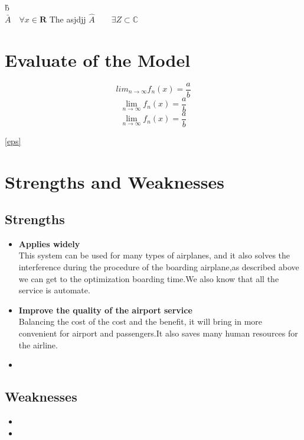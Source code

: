 \documentclass{mcmthesis}
\begin{document}
    \^{b}\\
\begin{math}
\bar{A} \quad \forall x \in \mathbf{R}
\end{math}
The asjdjj $\widehat{A}\qquad \exists Z \subset \mathbb{C}$

\section{Evaluate of the Model}
\lipsum[2]

\begin{equation}	\label{eq:eps}		%
lim_{n \to \infty} f_{n}(x) = \frac{a}{b}
\end{equation}
\[\mathop {\lim }\limits_{n \to \infty } {f_n}(x) = \frac{a}{b}\]
\begin{equation}
\mathop {\lim }\limits_{n \to \infty } {f_n}(x) = \frac{a}{b}
\end{equation}

\eqref{eps}				%


\section{Strengths and Weaknesses}
\subsection{Strengths}
\begin{itemize}
\item \textbf{Applies widely}\\
This  system can be used for many types of airplanes, and it also
solves the interference during  the procedure of the boarding
airplane,as described above we can get to the  optimization
boarding time.We also know that all the service is automate.
\item \textbf{Improve the quality of the airport service}\\
Balancing the cost of the cost and the benefit, it will bring in
more convenient  for airport and passengers.It also saves many
human resources for the airline. \item \textbf{}
\end{itemize}

\subsection{Weaknesses}
\begin{itemize}
\item
\item
\end{itemize}
\end{document}
